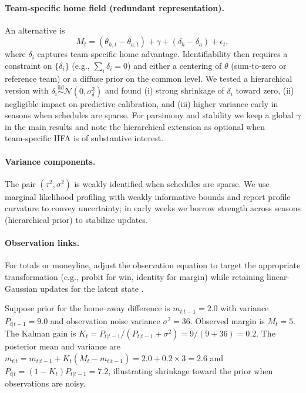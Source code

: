 \paragraph{Team‑specific home field (redundant representation).} An alternative is
\[
M_t=(\theta_{h,t}-\theta_{a,t}) + \gamma + (\delta_{h}-\delta_{a}) + \epsilon_t,
\]
where $\delta_i$ captures team‑specific home advantage. Identifiability then requires a constraint on $\{\delta_i\}$ (e.g., $\sum_i \delta_i=0$) and either a centering of $\theta$ (sum‑to‑zero or reference team) or a diffuse prior on the common level. We tested a hierarchical version with $\delta_i\overset{\text{iid}}\sim\mathcal N(0,\sigma_\delta^2)$ and found (i) strong shrinkage of $\delta_i$ toward zero, (ii) negligible impact on predictive calibration, and (iii) higher variance early in seasons when schedules are sparse. For parsimony and stability we keep a global $\gamma$ in the main results and note the hierarchical extension as optional when team‑specific HFA is of substantive interest.

\paragraph{Variance components.} The pair $(\tau^2,\sigma^2)$ is weakly identified when schedules are sparse. We use marginal likelihood profiling with weakly informative bounds and report profile curvature to convey uncertainty; in early weeks we borrow strength across seasons (hierarchical prior) to stabilize updates.

\paragraph{Observation links.} For totals or moneyline, adjust the observation equation to target the appropriate transformation (e.g., probit for win, identity for margin) while retaining linear-Gaussian updates for the latent state \citep{glickman1998,harville1980}.

\begin{example}
Suppose prior for the home--away difference is $m_{t|t-1}=2.0$ with variance $P_{t|t-1}=9.0$ and observation noise variance $\sigma^2=36$. Observed margin is $M_t=5$. The Kalman gain is $K_t=P_{t|t-1}/(P_{t|t-1}+\sigma^2)=9/(9+36)=0.2$. The posterior mean and variance are $m_{t|t}=m_{t|t-1}+K_t(M_t-m_{t|t-1})=2.0+0.2\times3=2.6$ and $P_{t|t}=(1-K_t)P_{t|t-1}=7.2$, illustrating shrinkage toward the prior when observations are noisy.
\end{example}

